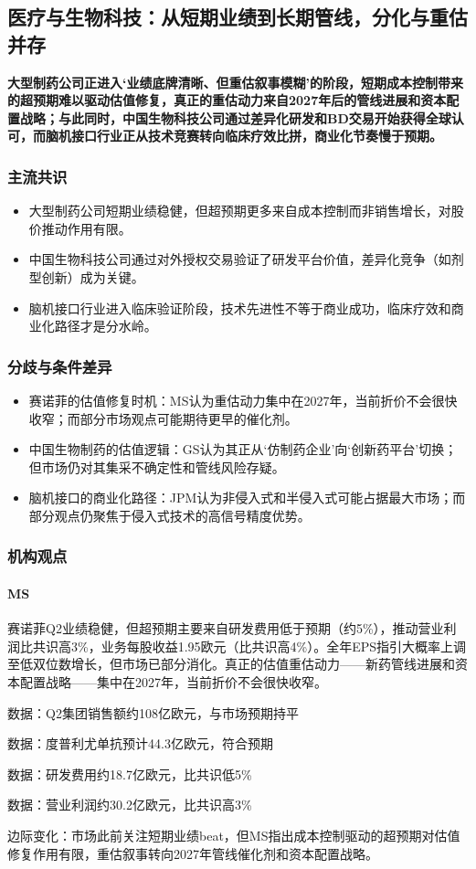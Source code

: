 \documentclass[11pt]{ctexart}
\begin{document}
\subsection{医疗与生物科技：从短期业绩到长期管线，分化与重估并存}
\textbf{大型制药公司正进入‘业绩底牌清晰、但重估叙事模糊’的阶段，短期成本控制带来的超预期难以驱动估值修复，真正的重估动力来自2027年后的管线进展和资本配置战略；与此同时，中国生物科技公司通过差异化研发和BD交易开始获得全球认可，而脑机接口行业正从技术竞赛转向临床疗效比拼，商业化节奏慢于预期。}
\subsubsection*{主流共识}
\begin{itemize}
  \item 大型制药公司短期业绩稳健，但超预期更多来自成本控制而非销售增长，对股价推动作用有限。
  \item 中国生物科技公司通过对外授权交易验证了研发平台价值，差异化竞争（如剂型创新）成为关键。
  \item 脑机接口行业进入临床验证阶段，技术先进性不等于商业成功，临床疗效和商业化路径才是分水岭。
\end{itemize}
\subsubsection*{分歧与条件差异}
\begin{itemize}
  \item 赛诺菲的估值修复时机：MS认为重估动力集中在2027年，当前折价不会很快收窄；而部分市场观点可能期待更早的催化剂。
  \item 中国生物制药的估值逻辑：GS认为其正从‘仿制药企业’向‘创新药平台’切换；但市场仍对其集采不确定性和管线风险存疑。
  \item 脑机接口的商业化路径：JPM认为非侵入式和半侵入式可能占据最大市场；而部分观点仍聚焦于侵入式技术的高信号精度优势。
\end{itemize}
\subsubsection*{机构观点}
\paragraph{MS} 赛诺菲Q2业绩稳健，但超预期主要来自研发费用低于预期（约5\%），推动营业利润比共识高3\%，业务每股收益1.95欧元（比共识高4\%）。全年EPS指引大概率上调至低双位数增长，但市场已部分消化。真正的估值重估动力——新药管线进展和资本配置战略——集中在2027年，当前折价不会很快收窄。
{\small\color{refgray}数据：Q2集团销售额约108亿欧元，与市场预期持平\par}
{\small\color{refgray}数据：度普利尤单抗预计44.3亿欧元，符合预期\par}
{\small\color{refgray}数据：研发费用约18.7亿欧元，比共识低5\%\par}
{\small\color{refgray}数据：营业利润约30.2亿欧元，比共识高3\%\par}
{\small\color{refgray}边际变化：市场此前关注短期业绩beat，但MS指出成本控制驱动的超预期对估值修复作用有限，重估叙事转向2027年管线催化剂和资本配置战略。\par}
\end{document}
